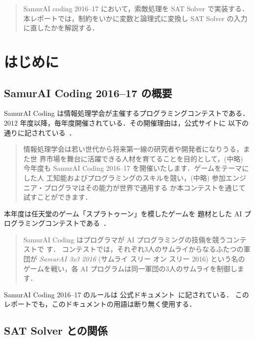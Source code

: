 
\begin{abstract}
 SamurAI coding 2016--17 において，索敵処理を SAT Solver で実装する．
 本レポートでは，制約をいかに変数と論理式に変換し SAT Solver
 の入力に直したかを解説する．
\end{abstract}

\section{はじめに}

\subsection{SamurAI Coding 2016--17 の概要}

SamurAI Coding は情報処理学会が主催するプログラミングコンテストである．
2012 年度以降，毎年度開催されている．その開催理由は，公式サイトに
以下の通りに記されている~\cite{koushiki}．

\begin{quotation}
情報処理学会は若い世代から将来第一線の研究者や開発者になりうる，また世
界市場を舞台に活躍できる人材を育てることを目的として，(中略)
今年度も SamurAI Coding 2016--17 を開催いたします．ゲームをテーマにした人
工知能およびプログラミングのスキルを競い，(中略)
参加エンジニア・プログラマはその能力が世界で通用する
か本コンテストを通じて試すことができます．
\end{quotation}

本年度は任天堂のゲーム「スプラトゥーン」を模したゲームを
題材とした AI プログラミングコンテストである~\cite{koushiki-rules}．

\begin{quotation}
SamurAI Coding はプログラマが AI プログラミングの技倆を競うコンテストで
す． コンテストでは，それぞれ3人のサムライからなるふたつの軍団が \textit{SamurAI
3x3 2016} (サムライ スリー オン スリー 2016) という名のゲームを戦い，各
AI プログラムは同一軍団の3人のサムライを制御します．
\end{quotation}

SamurAI Coding 2016--17 のルールは
公式ドキュメント~\cite{rules}に記されている．
このレポートでも，このドキュメントの用語は断り無く使用する．

\subsection{SAT Solver との関係}

